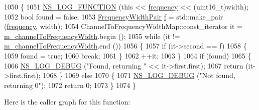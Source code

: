 \begin{DoxyCode}
1050 \{
1051   \hyperlink{log-macros-disabled_8h_a90b90d5bad1f39cb1b64923ea94c0761}{NS\_LOG\_FUNCTION} (\textcolor{keyword}{this} << \hyperlink{lte_2model_2fading-traces_2fading__trace__generator_8m_a09045328d6d7e16aa4013f526cc6993d}{frequency} << (uint16\_t)width);
1052   \textcolor{keywordtype}{bool} found = \textcolor{keyword}{false};
1053   \hyperlink{classns3_1_1WifiPhy_abb7b47ebed22c2703bcc239729d1e40c}{FrequencyWidthPair} \hyperlink{buildings__pathloss_8m_aa52d3a6e3de5a80a97c12364caeaa125}{f} = std::make\_pair (\hyperlink{lte_2model_2fading-traces_2fading__trace__generator_8m_a09045328d6d7e16aa4013f526cc6993d}{frequency}, width);
1054   ChannelToFrequencyWidthMap::const\_iterator it = \hyperlink{classns3_1_1WifiPhy_ad19aaf8e6db288dcfbba6fce31dccbaf}{m\_channelToFrequencyWidth}.begin 
      ();
1055   \textcolor{keywordflow}{while} (it != \hyperlink{classns3_1_1WifiPhy_ad19aaf8e6db288dcfbba6fce31dccbaf}{m\_channelToFrequencyWidth}.end ())
1056     \{
1057       \textcolor{keywordflow}{if} (it->second == f)
1058         \{
1059           found = \textcolor{keyword}{true};
1060           \textcolor{keywordflow}{break};
1061         \}
1062       ++it;
1063     \}
1064   \textcolor{keywordflow}{if} (found)
1065     \{
1066       \hyperlink{group__logging_ga413f1886406d49f59a6a0a89b77b4d0a}{NS\_LOG\_DEBUG} (\textcolor{stringliteral}{"Found, returning "} << it->first.first);
1067       \textcolor{keywordflow}{return} (it->first.first);
1068     \}
1069   \textcolor{keywordflow}{else}
1070     \{
1071       \hyperlink{group__logging_ga413f1886406d49f59a6a0a89b77b4d0a}{NS\_LOG\_DEBUG} (\textcolor{stringliteral}{"Not found, returning 0"});
1072       \textcolor{keywordflow}{return} 0;
1073     \}
1074 \}
\end{DoxyCode}


Here is the caller graph for this function\+:


